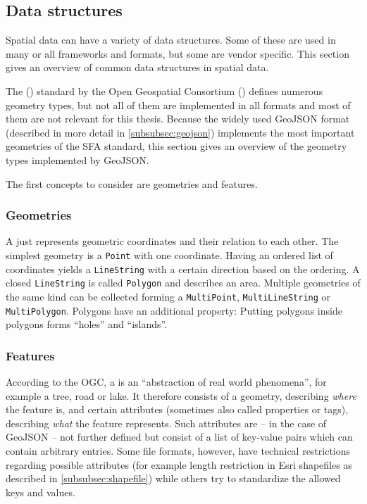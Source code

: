 	\subsection{Data structures}
	\label{subsec:data-structures}
	
		Spatial data can have a variety of data structures.
		Some of these are used in many or all frameworks and formats, but some are vendor specific.
		This section gives an overview of common data structures in spatial data.
		
		The  () standard by the Open Geospatial Consortium () defines numerous geometry types\cite{ogc-sfa}, but not all of them are implemented in all formats and most of them are not relevant for this thesis.
		Because the widely used GeoJSON format (described in more detail in \cref{subsubsec:geojson}) implements the most important geometries of the SFA standard\cite[2]{ietf-geojson}, this section gives an overview of the geometry types implemented by GeoJSON.
		
		The first concepts to consider are geometries and features.
		
		\subsubsection{Geometries}
		
			A  just represents geometric coordinates and their relation to each other.
			The simplest geometry is a \texttt{Point} with one coordinate.
			Having an ordered list of coordinates yields a \texttt{LineString} with a certain direction based on the ordering.
			A closed \texttt{LineString} is called \texttt{Polygon} and describes an area.
			Multiple geometries of the same kind can be collected forming a \texttt{MultiPoint}, \texttt{MultiLineString} or \texttt{MultiPolygon}.
			Polygons have an additional property:
			Putting polygons inside polygons forms \enquote{holes} and \enquote{islands}.
		
		\subsubsection{Features}
		
			According to the OGC, a  is an \enquote{abstraction of real world phenomena}\cite[9]{ogc-sfa}, for example a tree, road or lake.
			It therefore consists of a geometry, describing \textit{where} the feature is, and certain attributes (sometimes also called properties or tags), describing \textit{what} the feature represents.
			Such attributes are -- in the case of GeoJSON -- not further defined but consist of a list of key-value pairs which can contain arbitrary entries.
			Some file formats, however, have technical restrictions regarding possible attributes (for example length restriction in Esri shapefiles as described in \cref{subsubsec:shapefile}) while others try to standardize the allowed keys and values.
		
